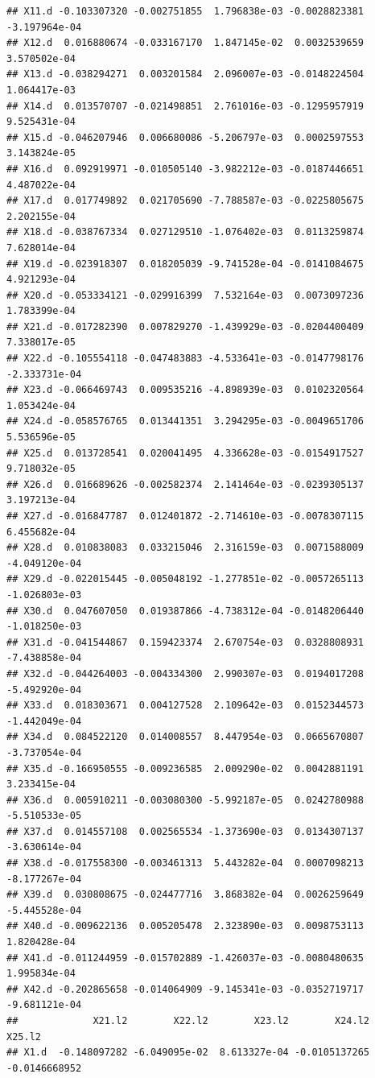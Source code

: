 \documentclass[]{article}
\begin{document}
\begin{verbatim}
## X11.d -0.103307320 -0.002751855  1.796838e-03 -0.0028823381 -3.197964e-04
## X12.d  0.016880674 -0.033167170  1.847145e-02  0.0032539659  3.570502e-04
## X13.d -0.038294271  0.003201584  2.096007e-03 -0.0148224504  1.064417e-03
## X14.d  0.013570707 -0.021498851  2.761016e-03 -0.1295957919  9.525431e-04
## X15.d -0.046207946  0.006680086 -5.206797e-03  0.0002597553  3.143824e-05
## X16.d  0.092919971 -0.010505140 -3.982212e-03 -0.0187446651  4.487022e-04
## X17.d  0.017749892  0.021705690 -7.788587e-03 -0.0225805675  2.202155e-04
## X18.d -0.038767334  0.027129510 -1.076402e-03  0.0113259874  7.628014e-04
## X19.d -0.023918307  0.018205039 -9.741528e-04 -0.0141084675  4.921293e-04
## X20.d -0.053334121 -0.029916399  7.532164e-03  0.0073097236  1.783399e-04
## X21.d -0.017282390  0.007829270 -1.439929e-03 -0.0204400409  7.338017e-05
## X22.d -0.105554118 -0.047483883 -4.533641e-03 -0.0147798176 -2.333731e-04
## X23.d -0.066469743  0.009535216 -4.898939e-03  0.0102320564  1.053424e-04
## X24.d -0.058576765  0.013441351  3.294295e-03 -0.0049651706  5.536596e-05
## X25.d  0.013728541  0.020041495  4.336628e-03 -0.0154917527  9.718032e-05
## X26.d  0.016689626 -0.002582374  2.141464e-03 -0.0239305137  3.197213e-04
## X27.d -0.016847787  0.012401872 -2.714610e-03 -0.0078307115  6.455682e-04
## X28.d  0.010838083  0.033215046  2.316159e-03  0.0071588009 -4.049120e-04
## X29.d -0.022015445 -0.005048192 -1.277851e-02 -0.0057265113 -1.026803e-03
## X30.d  0.047607050  0.019387866 -4.738312e-04 -0.0148206440 -1.018250e-03
## X31.d -0.041544867  0.159423374  2.670754e-03  0.0328808931 -7.438858e-04
## X32.d -0.044264003 -0.004334300  2.990307e-03  0.0194017208 -5.492920e-04
## X33.d  0.018303671  0.004127528  2.109642e-03  0.0152344573 -1.442049e-04
## X34.d  0.084522120  0.014008557  8.447954e-03  0.0665670807 -3.737054e-04
## X35.d -0.166950555 -0.009236585  2.009290e-02  0.0042881191  3.233415e-04
## X36.d  0.005910211 -0.003080300 -5.992187e-05  0.0242780988 -5.510533e-05
## X37.d  0.014557108  0.002565534 -1.373690e-03  0.0134307137 -3.630614e-04
## X38.d -0.017558300 -0.003461313  5.443282e-04  0.0007098213 -8.177267e-04
## X39.d  0.030808675 -0.024477716  3.868382e-04  0.0026259649 -5.445528e-04
## X40.d -0.009622136  0.005205478  2.323890e-03  0.0098753113  1.820428e-04
## X41.d -0.011244959 -0.015702889 -1.426037e-03 -0.0080480635  1.995834e-04
## X42.d -0.202865658 -0.014064909 -9.145341e-03 -0.0352719717 -9.681121e-04
##             X21.l2        X22.l2        X23.l2        X24.l2        X25.l2
## X1.d  -0.148097282 -6.049095e-02  8.613327e-04 -0.0105137265 -0.0146668952

\end{verbatim}
\end{document}
